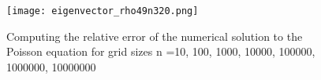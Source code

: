 \FloatBarrier
\begin{figure}[!ht]
\centering
\FloatBarrier
\texttt{[image: eigenvector\_rho49n320.png]}

\caption{Computing the relative error of the numerical solution to the Poisson equation for grid sizes n =10, 100, 1000, 10000, 100000, 1000000, 10000000}
\label{fig:Error_poisson}
\end{figure}
\FloatBarrier




%
%
